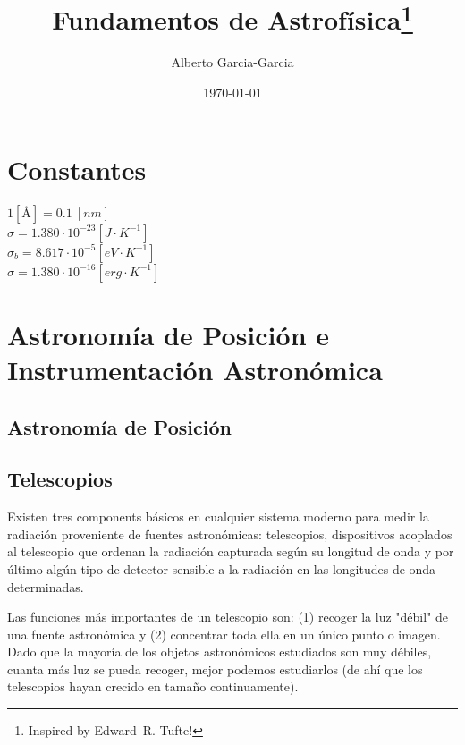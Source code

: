 \documentclass{tufte-handout}
\title{Fundamentos de Astrofísica\thanks{Inspired by Edward~R. Tufte!}}
\author[Alberto Garcia-Garcia]{Alberto Garcia-Garcia}
\date{\today}  %
\begin{document}
\maketitle%

\begin{abstract}
%
\end{abstract}

\tableofcontents

\clearpage

\section{Constantes}

$1 [\si{\angstrom}] = 0.1 ~[nm]$\\
$\sigma = 1.380 \cdot 10^{-23} [J \cdot K^{-1}]$\\
$\sigma_b = 8.617 \cdot 10^{-5} [eV \cdot K^{-1}]$\\
$\sigma = 1.380 \cdot 10^{-16} [erg \cdot K^{-1}]$\\ 

\clearpage

\section{Astronomía de Posición e Instrumentación Astronómica}

\subsection{Astronomía de Posición}

\subsection{Telescopios}

Existen tres components básicos en cualquier sistema moderno para medir la radiación proveniente de fuentes astronómicas: telescopios, dispositivos acoplados al telescopio que ordenan la radiación capturada según su longitud de onda y por último algún tipo de detector sensible a la radiación en las longitudes de onda determinadas.

Las funciones más importantes de un telescopio son: (1) recoger la luz "débil" de una fuente astronómica y (2) concentrar toda ella en un único punto o imagen. Dado que la mayoría de los objetos astronómicos estudiados son muy débiles, cuanta más luz se pueda recoger, mejor podemos estudiarlos (de ahí que los telescopios hayan crecido en tamaño continuamente).
\end{document}
